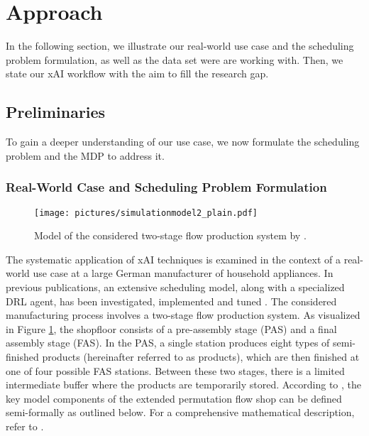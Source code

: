 \section{Approach}
In the following section, we illustrate our real-world use case and the scheduling problem formulation, as well as the data set were are working with. Then, we state our xAI workflow with the aim to fill the research gap.

\subsection{Preliminaries}
To gain a deeper understanding of our use case, we now formulate the scheduling problem and the MDP to address it.

\subsubsection{Real-World Case and Scheduling Problem Formulation}
\begin{figure}[ht!]
    \centering
    \texttt{[image: pictures/simulationmodel2\_plain.pdf]}
    \caption{Model of the considered two-stage flow production system by .}
    \label{fig:sim_model}
\end{figure}
\FloatBarrier

The systematic application of xAI techniques is examined in the context of a real-world use case at a large German manufacturer of household appliances. In previous publications, an extensive scheduling model, along with a specialized DRL agent, has been investigated, implemented and tuned . The considered manufacturing process involves a two-stage flow production system. As visualized in Figure \ref{fig:sim_model}, the shopfloor consists of a pre-assembly stage (PAS) and a final assembly stage (FAS). In the PAS, a single station produces eight types of semi-finished products (hereinafter referred to as products), which are then finished at one of four possible FAS stations. Between these two stages, there is a limited intermediate buffer where the products are temporarily stored. According to , the key model components of the extended permutation flow shop can be defined semi-formally as outlined below. For a comprehensive mathematical description, refer to .

